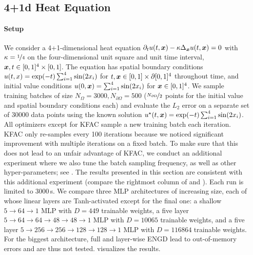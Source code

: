 \subsection{4+1d Heat Equation}\label{sec:4d-heat-app}

\paragraph{Setup} We consider a 4+1-dimensional heat equation $\partial_tu(t,{\bm{x}}) - \kappa \Delta_{{\bm{x}}} u(t, {\bm{x}}) = 0$ with $\kappa = \nicefrac{1}{4}$ on the four-dimensional unit square and unit time interval, ${\bm{x}}, t \in [0,1]^4 \times [0,1]$.
The equation has spatial boundary conditions $u(t, x) = \exp(-t) \sum_{i=1}^4 \sin( 2 {x}_i)$ for $t, {\bm{x}} \in [0,1] \times \partial [0,1]^4$ throughout time, and initial value conditions $u(0, {\bm{x}}) = \sum_{i=1}^4 \sin(2 {x}_i)$ for ${\bm{x}} \in [0,1]^4$.
We sample training batches of size $N_{\Omega} = \num{3000}, N_{\partial\Omega} = 500$ ($\nicefrac{N_{\partial\Omega}}{2}$ points for the initial value and spatial boundary conditions each) and evaluate the $L_2$ error on a separate set of $\num{30000}$ data points using the known solution $u^{\star}(t, {\bm{x}}) = \exp(-t) \sum_{i=1}^4 \sin(2 {x}_i)$.
All optimizers except for KFAC sample a new training batch each iteration.
KFAC only re-samples every 100 iterations because we noticed significant improvement with multiple iterations on a fixed batch.
To make sure that this does not lead to an unfair advantage of KFAC, we conduct an additional experiment where we also tune the batch sampling frequency, as well as other hyper-parameters; see .
The results presented in this section are consistent with this additional experiment (compare the rightmost column of  and ).
Each run is limited to 3000\,s.
We compare three MLP architectures of increasing size, each of whose linear layers are Tanh-activated except for the final one: a shallow $5\to 64\to 1$ MLP with $D=449$ trainable weights, a five layer $5 \to 64 \to 64 \to 48 \to 48 \to 1$ MLP with $D=\num{10065}$ trainable weights, and a five layer $5 \to 256 \to 256\to 128 \to 128 \to 1$ MLP with $D=\num{116864}$ trainable weights.
For the biggest architecture, full and layer-wise ENGD lead to out-of-memory errors and are thus not tested.
 visualizes the results.

